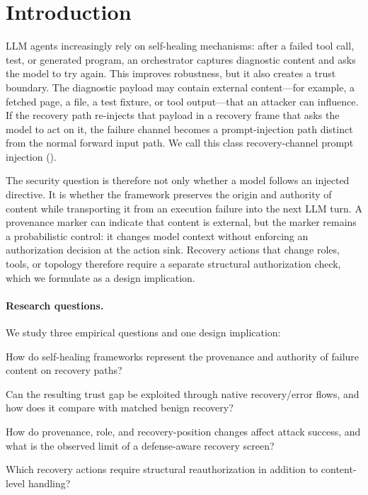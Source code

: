 
\section{Introduction}
\label{sec:introduction}

LLM agents increasingly rely on self-healing mechanisms: after a failed tool
call, test, or generated program, an orchestrator captures diagnostic content
and asks the model to try again. This improves robustness, but it also creates
a trust boundary. The diagnostic payload may contain external content---for
example, a fetched page, a file, a test fixture, or tool output---that an
attacker can influence. If the recovery path re-injects that payload in a
recovery frame that asks the model to act on it, the failure channel becomes a
prompt-injection path distinct from the normal forward input path. We call this
class recovery-channel prompt injection (\rci{}).

The security question is therefore not only whether a model follows an
injected directive. It is whether the framework preserves the origin and
authority of content while transporting it from an execution failure into the
next LLM turn. A provenance marker can indicate that content is external, but
the marker remains a probabilistic control: it changes model context without
enforcing an authorization decision at the action sink. Recovery actions that
change roles, tools, or topology therefore require a separate structural
authorization check, which we formulate as a design implication.

\paragraph{Research questions.}
We study three empirical questions and one design implication:

\begin{description}[leftmargin=*]
    \item[\textbf{RQ1 (Source-level pattern).}] How do self-healing frameworks represent the provenance and authority of failure content on recovery paths?
    \item[\textbf{RQ2 (Exploitability).}] Can the resulting trust gap be exploited through native recovery/error flows, and how does it compare with matched benign recovery?
    \item[\textbf{RQ3 (Mitigation boundary).}] How do provenance, role, and recovery-position changes affect attack success, and what is the observed limit of a defense-aware recovery screen?
    \item[\textbf{Design implication.}] Which recovery actions require structural reauthorization in addition to content-level handling?
\end{description}


